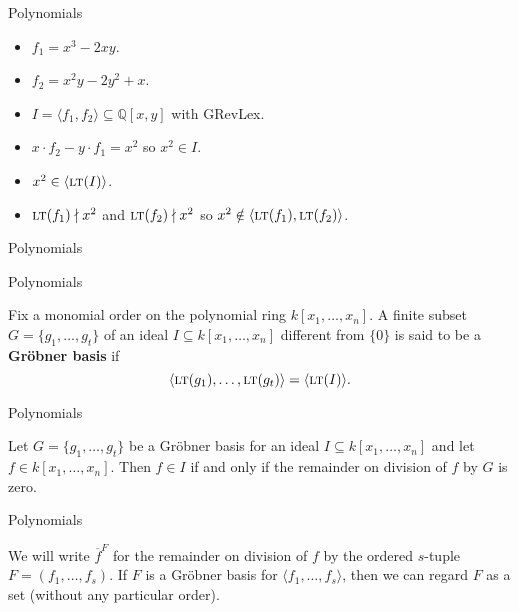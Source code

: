 \documentclass{beamer}
\def\bQ{\mathbb{Q}}
\def\sbs{\subseteq}
\newcommand{\LT}{\ensuremath{\text{\sc lt}}}
\begin{document}
\begin{frame}{Polynomials}
  \begin{itemize}
    \item $f_1=x^3-2xy$.
    \item<2-> $f_2=x^2y-2y^2+x$.
    \item<3-> $I = \langle f_1,f_2 \rangle \sbs \bQ[x,y]$ with GRevLex.
    \item<4-> $x \cdot f_2 - y \cdot f_1 = x^2$ so $x^2 \in I$.
    \item<5-> $x^2 \in \langle \LT(I) \rangle$.
    \item<6-> $\LT(f_1) \nmid x^2$ and $\LT(f_2) \nmid x^2$ so $x^2 \notin \langle \LT(f_1), \LT(f_2) \rangle$.
  \end{itemize}
\end{frame}

\begin{frame}{Polynomials}
\end{frame}

\begin{frame}{Polynomials}
  \begin{definition}
    Fix a monomial order on the polynomial ring $k[x_1,\dots,x_n]$. A finite subset $G = \{ g_1,\dots,g_t \}$ of an ideal $I \sbs k[x_1,\dots,x_n]$ different from $\{0\}$ is said to be a \textbf{Gr\"obner basis} if
    \[ \langle \LT(g_1), \dots, \LT(g_t) \rangle = \langle \LT(I) \rangle. \]
  \end{definition}
\end{frame}

\begin{frame}{Polynomials}
  \begin{theorem}
    Let $G = \{ g_1,\dots,g_t \}$ be a Gr\"obner basis for an ideal $I \sbs k[x_1,\dots,x_n]$ and let $f \in k[x_1,\dots,x_n]$. Then $f \in I$ if and only if the remainder on division of $f$ by $G$ is zero.
  \end{theorem}
\end{frame}

\begin{frame}{Polynomials}
  \begin{definition}
    We will write $\overline f^{F}$ for the remainder on division of $f$ by the ordered $s$-tuple $F = (f_1,\dots,f_s)$. If $F$ is a Gr\"obner basis for $\langle f_1,\dots,f_s \rangle$, then we can regard $F$ as a set  (without any particular order).
  \end{definition}
\end{frame}
\end{document}
